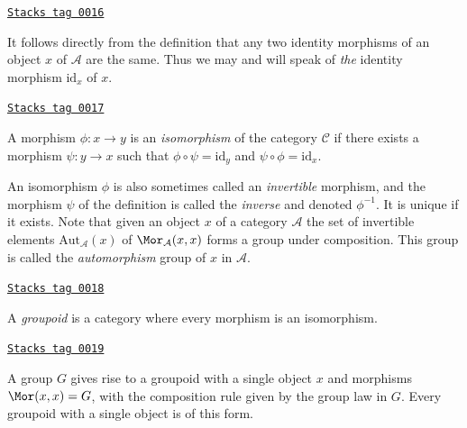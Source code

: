 \begin{remark}
\label{categories-remark-unique-identity}
\href{https://stacks.math.columbia.edu/tag/0016}{\texttt{Stacks tag 0016}}

It follows directly from the definition that any two identity morphisms
of an object $x$ of $\mathcal{A}$ are the same. Thus we may and will
speak of {\it the} identity morphism $\text{id}_x$ of $x$.
\end{remark}

\begin{definition}[Isomorphism]
\label{categories-definition-isomorphism}
\href{https://stacks.math.columbia.edu/tag/0017}{\texttt{Stacks tag 0017}}

A morphism $\phi : x \to y$ is an {\it isomorphism} of the category
$\mathcal{C}$ if there exists a morphism $\psi : y \to x$
such that $\phi \circ \psi = \text{id}_y$ and
$\psi \circ \phi = \text{id}_x$.
\end{definition}

An isomorphism $\phi$ is also sometimes called an {\it invertible}
morphism, and the morphism $\psi$ of the definition is called the
{\it inverse} and denoted $\phi^{-1}$. It is unique if it exists. Note that
given an object $x$ of a category $\mathcal{A}$ the set of invertible
elements $\text{Aut}_\mathcal{A}(x)$
of $\Mor_\mathcal{A}(x, x)$ forms a group under composition.
This group is called the {\it automorphism} group of $x$ in $\mathcal{A}$.

\begin{definition}[Groupoid]
\label{categories-definition-groupoid}
\href{https://stacks.math.columbia.edu/tag/0018}{\texttt{Stacks tag 0018}}

A {\it groupoid} is a category where every morphism is an isomorphism.
\end{definition}

\begin{example}
\label{categories-example-group-groupoid}
\href{https://stacks.math.columbia.edu/tag/0019}{\texttt{Stacks tag 0019}}

A group $G$ gives rise to a groupoid with a single object $x$
and morphisms $\Mor(x, x) = G$, with the composition rule
given by the group law in $G$. Every groupoid with a single
object is of this form.
\end{example}

